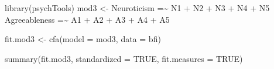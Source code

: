 \documentclass[
  letterpaper,
  DIV=11,
  numbers=noendperiod]{scrreprt}
\newenvironment{Shaded}{\begin{snugshade}}{\end{snugshade}}
\newcommand{\AttributeTok}[1]{\textcolor[rgb]{0.40,0.45,0.13}{#1}}
\newcommand{\ConstantTok}[1]{\textcolor[rgb]{0.56,0.35,0.01}{#1}}
\newcommand{\FunctionTok}[1]{\textcolor[rgb]{0.28,0.35,0.67}{#1}}
\newcommand{\NormalTok}[1]{\textcolor[rgb]{0.00,0.23,0.31}{#1}}
\newcommand{\OtherTok}[1]{\textcolor[rgb]{0.00,0.23,0.31}{#1}}
\newcommand{\StringTok}[1]{\textcolor[rgb]{0.13,0.47,0.30}{#1}}
\begin{document}
\begin{Shaded}
\begin{Highlighting}[]
\FunctionTok{library}\NormalTok{(psychTools)}
\NormalTok{mod3 }\OtherTok{\textless{}{-}} \StringTok{\textquotesingle{}}
\StringTok{Neuroticism   =\textasciitilde{} N1 + N2 + N3 + N4 + N5}
\StringTok{Agreeableness =\textasciitilde{} A1 + A2 + A3 + A4 + A5}
\StringTok{\textquotesingle{}}

\NormalTok{fit.mod3 }\OtherTok{\textless{}{-}} \FunctionTok{cfa}\NormalTok{(}\AttributeTok{model =}\NormalTok{ mod3, }
                \AttributeTok{data  =}\NormalTok{ bfi)}

\FunctionTok{summary}\NormalTok{(fit.mod3, }
        \AttributeTok{standardized =} \ConstantTok{TRUE}\NormalTok{, }
        \AttributeTok{fit.measures =} \ConstantTok{TRUE}\NormalTok{)}
\end{Highlighting}
\end{Shaded}
\end{document}
